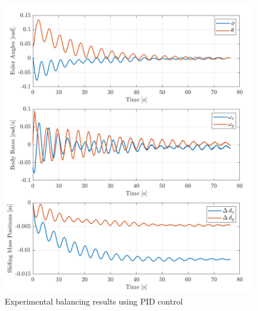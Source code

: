 \begin{figure}[!ht]
    \centering
    \includegraphics[width=\linewidth]{plots/PID_hardware_results.png}
    \caption{Experimental balancing results using PID control}
\end{figure}

